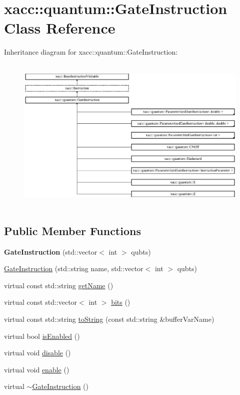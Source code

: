 \hypertarget{a01276}{}\section{xacc\+:\+:quantum\+:\+:Gate\+Instruction Class Reference}
\label{a01276}
Inheritance diagram for xacc\+:\+:quantum\+:\+:Gate\+Instruction\+:\begin{figure}[H]
\begin{center}
\leavevmode
\includegraphics[height=7.512195cm]{a01276}
\end{center}
\end{figure}
\subsection*{Public Member Functions}
\begin{DoxyCompactItemize}
\item 
\mbox{\label{a01276_a951ac3f44fcfbcf187bb73ba7438b472}} 
{\bfseries Gate\+Instruction} (std\+::vector$<$ int $>$ qubts)
\item 
\hyperlink{a01276_a9b8543b79576c69ab8578ab6228134d7}{Gate\+Instruction} (std\+::string name, std\+::vector$<$ int $>$ qubts)
\item 
virtual const std\+::string \hyperlink{a01276_a0db03b9e46eeba1134f0ca2b83ccc842}{get\+Name} ()
\item 
virtual const std\+::vector$<$ int $>$ \hyperlink{a01276_ad32ad03dfc516e00093030e60178003d}{bits} ()
\item 
virtual const std\+::string \hyperlink{a01276_a089a5da67ff40ac1a6f56e64589822d9}{to\+String} (const std\+::string \&buffer\+Var\+Name)
\item 
virtual bool \hyperlink{a01276_a0a821be322b0c848b01c55f91fc8f484}{is\+Enabled} ()
\item 
virtual void \hyperlink{a01276_a63ce138dd71fb43d303f5600fefb7215}{disable} ()
\item 
virtual void \hyperlink{a01276_a7a80474b7fd465271b3313432db2e608}{enable} ()
\item 
virtual \hyperlink{a01276_ab8a75144074b27262fc33c77db4528b7}{$\sim$\+Gate\+Instruction} ()
\end{DoxyCompactItemize}
